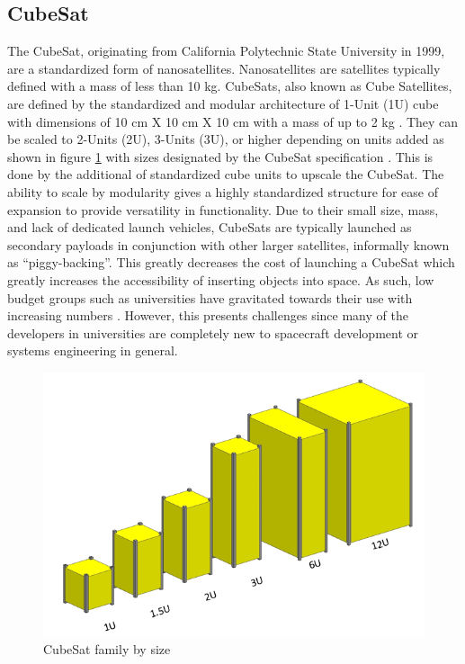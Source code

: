 \documentclass[journal,article,submit,pdftex,moreauthors]{Definitions/mdpi}
\begin{document}
\subsection{CubeSat}
The CubeSat, originating from California Polytechnic State University in 1999, are a standardized form of nanosatellites.  Nanosatellites are satellites typically defined with a mass of less than 10 kg.  CubeSats, also known as Cube Satellites, are defined by the standardized and modular architecture of 1-Unit (1U) cube with dimensions of 10 cm X 10 cm X 10 cm with a mass of up to 2 kg \cite{cds_rev14}.  They can be scaled to 2-Units (2U), 3-Units (3U), or higher depending on units added as shown in figure \ref{fig:cubesat_family} with sizes designated by the CubeSat specification \cite{cds_rev14}.  This is done by the additional of standardized cube units to upscale the CubeSat.  The ability to scale by modularity gives a highly standardized structure for ease of expansion to provide versatility in functionality.  Due to their small size, mass, and lack of dedicated launch vehicles, CubeSats are typically launched as secondary payloads in conjunction with other larger satellites, informally known as “piggy-backing”.  This greatly decreases the cost of launching a CubeSat which greatly increases the accessibility of inserting objects into space.  As such, low budget groups such as universities have gravitated towards their use with increasing numbers \cite{swartwout_data}.  However, this presents challenges since many of the developers in universities are completely new to spacecraft development or systems engineering in general.

\begin{figure}[H]
    \includegraphics[width=10.5 cm]{assets/cubesat_family.png}
    \caption{CubeSat family by size \cite{cds_rev14}}
	\label{fig:cubesat_family}
    \end{figure}   
\unskip
\end{document}
